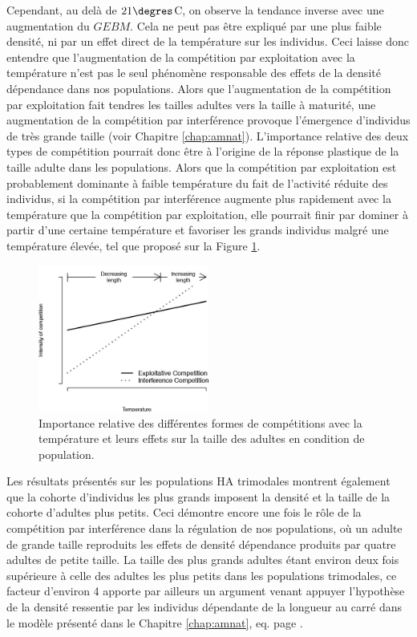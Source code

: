 Cependant, au delà de $21\degres$C, on observe la tendance inverse avec une
augmentation du $GEBM$. Cela ne peut pas être expliqué par une plus faible
densité, ni par un effet direct de la température sur les individus.
Ceci laisse donc entendre que l'augmentation de la compétition par exploitation
avec la température n'est pas le seul phénomène responsable des effets de la densité
dépendance dans nos populations. Alors que l'augmentation de la compétition par
exploitation fait tendres les tailles adultes vers la taille à maturité,
une augmentation de la compétition par interférence provoque l'émergence
d'individus de très grande taille (voir Chapitre \ref{chap:amnat}). L'importance
relative des deux types de compétition pourrait donc être à l'origine de la
réponse plastique de la taille adulte dans les populations. Alors que la
compétition par exploitation est probablement dominante à faible température du
fait de l'activité réduite des individus, si la compétition par interférence
augmente plus rapidement avec la température que la compétition par
exploitation, elle pourrait finir par dominer à partir d'une certaine
température et favoriser les grands individus malgré une
température élevée, tel que proposé sur la Figure \ref{fig:FIP7b}.

\begin{figure}[!ht]
\begin{center}
\includegraphics[width=0.5\textwidth]{1_CorpsDeThese/Resumes/Fig/FIP07b}
\caption[Importance relative
des différentes formes de compétitions]{Importance relative
des différentes formes de compétitions avec la température et leurs effets sur
la taille des adultes en condition de population.}
\label{fig:FIP7b}
\end{center}
\end{figure}

Les résultats présentés sur les populations HA trimodales montrent également que
la cohorte d'individus les plus grands imposent la densité et la taille de la
cohorte d'adultes plus petits. Ceci démontre encore une fois le rôle de la
compétition par interférence dans la régulation de nos populations, où un
adulte de grande taille reproduits les effets de densité dépendance produits par
quatre adultes de petite taille. La taille des plus grands adultes étant environ
deux fois supérieure à celle des adultes les plus petits dans les populations
trimodales, ce facteur d'environ 4 apporte par ailleurs un argument venant
appuyer l'hypothèse de la densité ressentie par les individus dépendante de la
longueur au carré dans le modèle présenté dans le Chapitre \ref{chap:amnat}, eq.
 page \pageref{eq_an2}.

